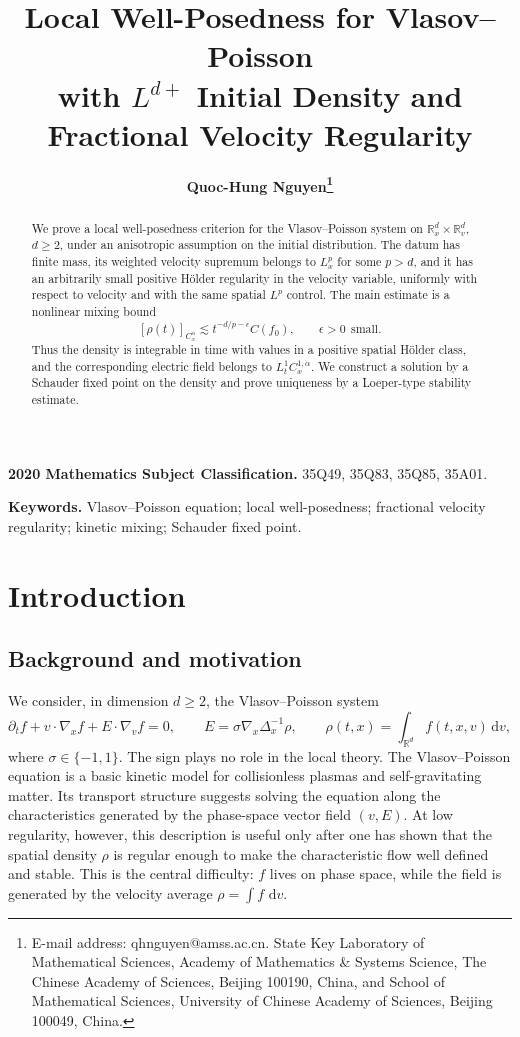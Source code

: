 \documentclass[11pt]{article}
\title{Local Well-Posedness for Vlasov--Poisson\\
with $L^{d+}$ Initial Density and Fractional Velocity Regularity}
\author{
  {\bf Quoc-Hung Nguyen\thanks{
      E-mail address: qhnguyen@amss.ac.cn.
      State Key Laboratory of Mathematical Sciences,
      Academy of Mathematics \& Systems Science,
      The Chinese Academy of Sciences, Beijing 100190, China,
      and School of Mathematical Sciences,
      University of Chinese Academy of Sciences,
      Beijing 100049, China.}}
}
\date{}
\newcommand{\R}{\mathbb R}
\newcommand{\dd}{\,\mathrm d}
\begin{document}
\maketitle

\begin{abstract}
We prove a local well-posedness criterion for the Vlasov--Poisson system on
$\R^d_x\times\R^d_v$, $d\geq2$, under an anisotropic assumption on the initial
distribution.  The datum has finite mass, its weighted velocity supremum
belongs to $L^p_x$ for some $p>d$, and it has an arbitrarily small positive
H\"older regularity in the velocity variable, uniformly with respect to
velocity and with the same spatial $L^p$ control.  The main estimate is a
nonlinear mixing bound
\[
 [\rho(t)]_{C^\alpha_x}\lesssim
 t^{-d/p-\epsilon}C(f_0),
 \qquad \epsilon>0~~\text{small}.
\]
Thus the density is integrable in time with values in a positive spatial
H\"older class, and the corresponding electric field belongs to
$L^1_tC^{1,\alpha}_x$.  We construct a solution by a
Schauder fixed point on the density and prove uniqueness by a
Loeper-type stability estimate.
\end{abstract}

\medskip
\noindent\textbf{2020 Mathematics Subject Classification.}
35Q49, 35Q83, 35Q85, 35A01.

\smallskip
\noindent\textbf{Keywords.}
Vlasov--Poisson equation; local well-posedness; fractional velocity
regularity; kinetic mixing; Schauder fixed
point.

\section{Introduction}

\subsection{Background and motivation}
We consider, in dimension $d\geq 2$, the Vlasov--Poisson system
\begin{equation}\label{VP}
 \partial_t f+v\cdot\nabla_x f+E\cdot\nabla_v f=0,
 \qquad E=\sigma\nabla_x\Delta_x^{-1}\rho,
 \qquad \rho(t,x)=\int_{\R^d}f(t,x,v)\dd v,
\end{equation}
where $\sigma\in\{-1,1\}$.  The sign plays no role in the local theory.
The Vlasov--Poisson equation is a basic kinetic model for collisionless
plasmas and self-gravitating matter.  Its transport structure suggests solving
the equation along the characteristics generated by the phase-space vector
field $(v,E)$.  At low regularity, however, this description is useful only
after one has shown that the spatial density $\rho$ is regular enough to make
the characteristic flow well defined and stable.  This is the central
difficulty: $f$ lives on phase space, while the field is generated by the
velocity average $\rho=\int f\,\dd v$.
\end{document}
